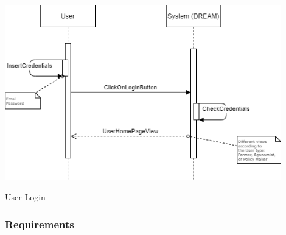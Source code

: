 \documentclass{article}
\begin{document}
\begin{center}
    \includegraphics[width=0.9\textwidth]{images/sequenceDiagrams/24. UserLogin.png}
    \par
    \caption{\label{fig:frog}User Login}

    \newpage
    
\end{center}


\subsubsection{Requirements}
\end{document}
